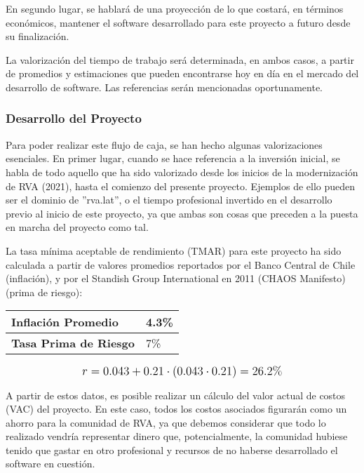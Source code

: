 En segundo lugar, se hablará de una proyección de lo que costará, en términos económicos, mantener el software desarrollado para este proyecto a futuro desde su finalización.

La valorización del tiempo de trabajo será determinada, en ambos casos, a partir de promedios y estimaciones que pueden encontrarse hoy en día en el mercado del desarrollo de software. Las referencias serán mencionadas oportunamente.

\subsubsection{Desarrollo del Proyecto}
Para poder realizar este flujo de caja, se han hecho algunas valorizaciones esenciales. En primer lugar, cuando se hace referencia a la inversión inicial, se habla de todo aquello que ha sido valorizado desde los inicios de la modernización de RVA (2021), hasta el comienzo del presente proyecto. Ejemplos de ello pueden ser el dominio de ''rva.lat'', o el tiempo profesional invertido en el desarrollo previo al inicio de este proyecto, ya que ambas son cosas que preceden a la puesta en marcha del proyecto como tal.

La tasa mínima aceptable de rendimiento (TMAR) para este proyecto ha sido calculada a partir de valores promedios reportados por el Banco Central de Chile (inflación), y por el Standish Group International en 2011 (CHAOS Manifesto) (prima de riesgo):

\begin{center}
	\begin{tabular}{ | p{7cm} | p{5cm}|}
		\hline
		{\textbf{Inflación Promedio}} & 4.3\%  \\ \hline
		{\textbf{Tasa Prima de Riesgo}} & 7\% \\ \hline
	\end{tabular}
\end{center}


\[
\mathlarger{
	r = 0.043+0.21\cdot(0.043\cdot0.21) = 26.2\%
}
\]

A partir de estos datos, es posible realizar un cálculo del valor actual de costos (VAC) del proyecto. En este caso, todos los costos asociados figurarán como un ahorro para la comunidad de RVA, ya que debemos considerar que todo lo realizado vendría representar dinero que, potencialmente, la comunidad hubiese tenido que gastar en otro profesional y recursos de no haberse desarrollado el software en cuestión.

